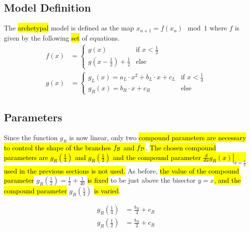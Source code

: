 \subsection{Model Definition}
\label{sec:setup.arch.definition}

The \hl{archetypal} model is defined as the map $x_{n+1} = f(x_n) \mod 1$ where $f$ is given by the following \hl{set} of equations.
\begin{align}
	f(x) & = \begin{cases}
		         g(x)                             & \text{if } x < \frac{1}{2} \\
		         g(x - \frac{1}{2}) + \frac{1}{2} & \text{else}
	         \end{cases} \label{equ:arch.f}           \\
	g(x) & = \begin{cases}
		         g_L(x) = a_L \cdot x^2 + b_L \cdot x + c_L & \text{if } x < \frac{1}{4} \\
		         g_R(x) = b_R \cdot x + c_R                 & \text{else}
	         \end{cases} \label{equ:arch.g}
\end{align}

\subsection{Parameters}
\label{sec:setup.arch.parameters}

Since the function $g_R$ is now linear, only two \hl{compound parameters are necessary to control the shape of the branches $f_{\mathcal{B}}$ and $f_{\mathcal{D}}$}.
\hl{
The chosen compound parameters are $g_R\left(\frac{1}{4}\right)$ and $g_R\left(\frac{1}{2}\right)$ and the compound parameter $\left. \frac{d}{dx} g_R(x) \right|_{x = \frac{1}{2}}$ used in the previous sections is not used.
}
As before, \hl{the value of the compound parameter} $g_R\left(\frac{1}{2}\right) = \frac{1}{2} + \frac{1}{40}$ \hl{is fixed} to be just above the bisector $y = x$\hl{, and the compound parameter} $g_R\left(\frac{1}{4}\right)$ \hl{is varied}.

\begin{subequations}
	\begin{align}
		g_R\left(\frac{1}{4}\right) & = \frac{b_R}{4} + c_R \label{equ:setup.arch.A} \\
		g_R\left(\frac{1}{2}\right) & = \frac{b_R}{2} + c_R \label{equ:setup.arch.B}
	\end{align}
\end{subequations}

